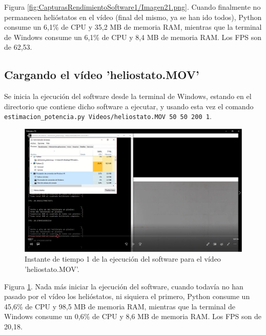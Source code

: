 Figura \ref{fig:CapturasRendimientoSoftware1/Imagen21.png}. Cuando finalmente no permanecen helióstatos en el vídeo (final del mismo, ya se han ido todos), Python consume un 6,1\% de CPU y 35,2 MB de memoria RAM, mientras que la terminal de Windows consume un 6,1\% de CPU y 8,4 MB de memoria RAM. Los FPS son de 62,53.\\[20pt]

\subsection{Cargando el vídeo 'heliostato.MOV'}

Se inicia la ejecución del software desde la terminal de Windows, estando en el directorio que contiene dicho software a ejecutar, y usando esta vez el comando \verb|estimacion_potencia.py Videos/heliostato.MOV 50 50 200 1|.

\begin{figure}[h!]
  	\centering
	\includegraphics[width=\textwidth]{CapturasRendimientoSoftware2/Imagen1.png}
	\caption{Instante de tiempo 1 de la ejecución del software para el vídeo 'heliostato.MOV'.
	\label{fig:CapturasRendimientoSoftware2/Imagen1.png}}
\end{figure}

Figura \ref{fig:CapturasRendimientoSoftware2/Imagen1.png}. Nada más iniciar la ejecución del software, cuando todavía no han pasado por el vídeo los helióstatos, ni siquiera el primero, Python consume un 45,6\% de CPU y 98,5 MB de memoria RAM, mientras que la terminal de Windows consume un 0,6\% de CPU y 8,6 MB de memoria RAM. Los FPS son de 20,18.\\[20pt]

